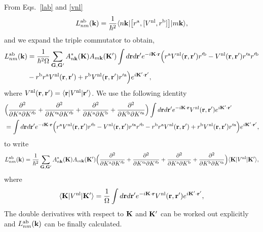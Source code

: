 \documentclass[floatfix,prb,aps,superscriptaddress,11pt,preprint,letterpaper]{revtex4}
\begin{document}
From Eqs.~\eqref{lab} and \eqref{vnl} 
\begin{align}\label{3.1}
L^{\mathrm{a}\mathrm{b}}_{nm}(\mathbf{k}) 
=
\frac{1}{\hbar^2}
\langle n\mathbf{k} |
\big[ r^{\mathrm{a}},[ V^{\mathrm{nl}}, r^{\mathrm{b}}]\big]
| m\mathbf{k} \rangle
,
\end{align} 
and we expand the triple commutator to obtain,
\begin{align}\label{3.5}
L^{\mathrm{a}\mathrm{b}}_{nm}(\mathbf{k}) 
&=
\frac{1}{\hbar^2\Omega}
\sum_{\mathbf{G},\mathbf{G}'} 
A^*_{n\mathbf{k}}(\mathbf{K}) 
A_{m\mathbf{k}}(\mathbf{K}')
\int
d\mathbf{r} d\mathbf{r}'
 e^{-i\mathbf{K}\cdot\mathbf{r}}
\Big(
r^{\mathrm{a}}
V^{\mathrm{nl}}(\mathbf{r},\mathbf{r}')
r'^{\mathrm{b}}
-
V^{\mathrm{nl}}(\mathbf{r},\mathbf{r}')
r'^{\mathrm{a}}
r'^{\mathrm{b}}
\nonumber\\
&-
r^{\mathrm{b}}
r^{\mathrm{a}}
V^{\mathrm{nl}}(\mathbf{r},\mathbf{r}')
+
 r^{\mathrm{b}}
V^{\mathrm{nl}}(\mathbf{r},\mathbf{r}')
r'^{\mathrm{a}}
\Big) 
 e^{i\mathbf{K}'\cdot\mathbf{r}'}
,
\end{align} 
where 
$V^{\mathrm{nl}}(\mathbf{r},\mathbf{r}') = \langle \mathbf{r} | V^{\mathrm{nl}}| \mathbf{r}' \rangle$.
We use the following identity
\begin{align}\label{3.4}
&
\Big(
\frac{\partial^2}{\partial K^{\mathrm{a}}\partial K'^{\mathrm{b}}}
+
\frac{\partial^2}{\partial K'^{\mathrm{a}}\partial K'^{\mathrm{b}}}
+
\frac{\partial^2}{\partial K^{\mathrm{a}}\partial K^{\mathrm{b}}}
+
\frac{\partial^2}{\partial K^{\mathrm{b}}\partial K'^{\mathrm{a}}}
\Big)
\int 
d\mathbf{r} d\mathbf{r}' 
 e^{-i\mathbf{K}\cdot\mathbf{r}}
V^{\mathrm{nl}}(\mathbf{r},\mathbf{r}') 
e^{i\mathbf{K}'\cdot\mathbf{r}'}
\nonumber\\
&=
\int d\mathbf{r} d\mathbf{r}'
 e^{-i\mathbf{K}\cdot\mathbf{r}}
\Big( 
r^{\mathrm{a}} 
V^{\mathrm{nl}}(\mathbf{r},\mathbf{r}') 
r'^{\mathrm{b}}
- 
V^{\mathrm{nl}}(\mathbf{r},\mathbf{r}') 
r'^{\mathrm{a}} 
r'^{\mathrm{b}}
- 
r^{\mathrm{b}} 
r^{\mathrm{a}} 
V^{\mathrm{nl}}(\mathbf{r},\mathbf{r}')
+
 r^{\mathrm{b}} 
V^{\mathrm{nl}}(\mathbf{r},\mathbf{r}') 
r'^{\mathrm{a}}
\Big)  
e^{i\mathbf{K}'\cdot\mathbf{r}'}
,
\end{align}
to write
\begin{align}\label{3.7}
L^{\mathrm{a}\mathrm{b}}_{nm}(\mathbf{k})
&=
\frac{1}{\hbar^2}
\sum_{\mathbf{G},\mathbf{G}'} 
A^*_{n\mathbf{k}}(\mathbf{K}) 
A_{m\mathbf{k}}(\mathbf{K}')
\Big(
\frac{\partial^2}{\partial K^{\mathrm{a}}\partial K'^{\mathrm{b}}}
+
\frac{\partial^2}{\partial K'^{\mathrm{a}}\partial K'^{\mathrm{b}}}
+
\frac{\partial^2}{\partial K^{\mathrm{a}}\partial K^{\mathrm{b}}}
+
\frac{\partial^2}{\partial K^{\mathrm{b}}\partial K'^{\mathrm{a}}}
\Big)
\langle \mathbf{K} | 
V^{\mathrm{nl}} 
| \mathbf{K}' \rangle, 
\nonumber\\
\end{align} 
where
\begin{align}\label{vkk}
\langle \mathbf{K} | 
V^{\mathrm{nl}} 
| \mathbf{K}' \rangle 
=
\frac{1}{\Omega}
\int 
d\mathbf{r} d\mathbf{r}' 
 e^{-i\mathbf{K}\cdot\mathbf{r}}
V^{\mathrm{nl}}(\mathbf{r},\mathbf{r}') 
e^{i\mathbf{K}'\cdot\mathbf{r}'}
,
\end{align}
The double derivatives with respect to $\mathbf{K}$ and $\mathbf{K}'$ 
can be worked out explicitly and 
$L^{\mathrm{a}\mathrm{b}}_{nm}(\mathbf{k})$
can be finally calculated.\cite{valerie}

\end{document}
